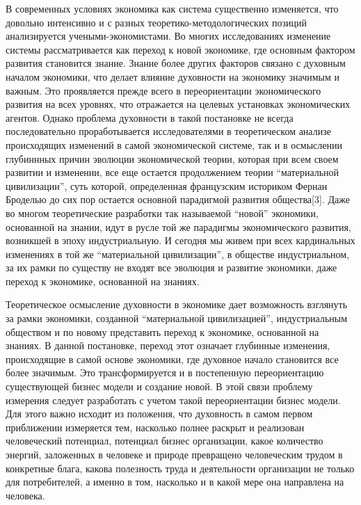 В современных условиях экономика как система существенно изменяется, что
довольно интенсивно и с разных теоретико-методологических позиций
анализируется учеными-экономистами. Во многих исследованиях изменение
системы рассматривается как переход к новой экономике, где основным
фактором развития становится знание. Знание более других факторов
связано с духовным началом экономики, что делает влияние духовности на
экономику значимым и важным. Это проявляется прежде всего в
переориентации экономического развития на всех уровнях, что отражается
на целевых установках экономических агентов. Однако проблема духовности
в такой постановке не всегда последовательно проработывается
исследователями в теоретическом анализе происходящих изменений в самой
экономической системе, так и в осмыслении глубиннных причин эволюции
экономической теории, которая при всем своем развитии и изменении, все
еще остается продолжением теории ``материальной цивилизации'', суть
которой, определенная французским историком Фернан Броделью до сих пор
остается основной парадигмой развития общества{[}3{]}. Даже во многом
теоретические разработки так называемой ``новой'' экономики, основанной
на знании, идут в русле той же парадигмы экономического развития,
возникшей в эпоху индустриальную. И сегодня мы живем при всех
кардинальных изменениях в той же ``материальной цивилизации'', в
обществе индустриальном, за их рамки по существу не входят все эволюция
и развитие экономики, даже переход к экономике, основанной на знаниях.

Теоретическое осмысление духовности в экономике дает возможность
взглянуть за рамки экономики, созданной ``материальной цивилизацией'',
индустриальным обществом и по новому представить переход к экономике,
основанной на знаниях. В данной постановке, переход этот означает
глубинные изменения, происходящие в самой основе экономики, где духовное
начало становится все более значимым. Это трансформируется и в
постепенную переориентацию существующей бизнес модели и создание новой.
В этой связи проблему измерения следует разработать с учетом такой
переориентации бизнес модели. Для этого важно исходит из положения, что
духовность в самом первом приближении измеряется тем, насколько полнее
раскрыт и реализован человеческий потенциал, потенциал бизнес
организации, какое количество энергий, заложенных в человеке и природе
превращено человеческим трудом в конкретные блага, какова полезность
труда и деятельности организации не только для потребителей, а именно в
том, насколько и в какой мере она направлена на человека.

